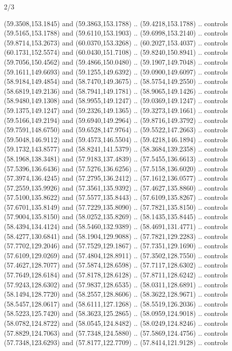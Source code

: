 \begin{flagdescription}{2/3}
\begin{scope}[shift={(0.5\flaglength,0.5)},scale=\flagwidth/320]
\begin{scope}[y=0.8pt, x=0.8pt, yscale=-1,shift={(-118.3,-146)}]
  (59.3508,153.1845) and (59.3863,153.1788) .. (59.4218,153.1788) .. controls
  (59.5165,153.1788) and (59.6110,153.1903) .. (59.6998,153.2140) .. controls
  (59.8714,153.2673) and (60.0370,153.3268) .. (60.2027,153.4037) .. controls
  (60.1731,152.5574) and (60.0430,151.7108) .. (59.8240,150.8941) .. controls
  (59.7056,150.4562) and (59.4866,150.0480) .. (59.1907,149.7048) .. controls
  (59.1611,149.6693) and (59.1255,149.6392) .. (59.0900,149.6097) .. controls
  (58.9184,149.4854) and (58.7470,149.3675) .. (58.5754,149.2550) .. controls
  (58.6819,149.2136) and (58.7941,149.1781) .. (58.9065,149.1426) .. controls
  (58.9480,149.1308) and (58.9955,149.1247) .. (59.0369,149.1247) .. controls
  (59.1375,149.1247) and (59.2326,149.1365) .. (59.3273,149.1661) .. controls
  (59.5166,149.2194) and (59.6940,149.2964) .. (59.8716,149.3792) .. controls
  (59.7591,148.6750) and (59.6528,147.9764) .. (59.5522,147.2663) .. controls
  (59.5048,146.9112) and (59.4573,146.5504) .. (59.4218,146.1894) .. controls
  (59.1732,143.8577) and (58.8241,141.5379) .. (58.3684,139.2358) .. controls
  (58.1968,138.3481) and (57.9183,137.4839) .. (57.5455,136.6613) .. controls
  (57.5396,136.6436) and (57.5276,136.6256) .. (57.5158,136.6020) .. controls
  (57.3974,136.4245) and (57.2795,136.2412) .. (57.1612,136.0577) .. controls
  (57.2559,135.9926) and (57.3561,135.9392) .. (57.4627,135.8860) .. controls
  (57.5100,135.8622) and (57.5577,135.8443) .. (57.6109,135.8267) .. controls
  (57.6701,135.8149) and (57.7229,135.8090) .. (57.7821,135.8150) .. controls
  (57.9004,135.8150) and (58.0252,135.8269) .. (58.1435,135.8445) .. controls
  (58.4394,134.4124) and (58.5460,132.9389) .. (58.4691,131.4771) .. controls
  (58.4277,130.6841) and (58.1904,129.9088) .. (57.7821,129.2283) .. controls
  (57.7702,129.2046) and (57.7529,129.1867) .. (57.7351,129.1690) .. controls
  (57.6109,129.0269) and (57.4804,128.8911) .. (57.3502,128.7550) .. controls
  (57.4627,128.7077) and (57.5874,128.6598) .. (57.7117,128.6302) .. controls
  (57.7649,128.6184) and (57.8178,128.6128) .. (57.8711,128.6242) .. controls
  (57.9243,128.6302) and (57.9837,128.6535) .. (58.0311,128.6891) .. controls
  (58.1494,128.7720) and (58.2557,128.8606) .. (58.3622,128.9671) .. controls
  (58.5457,128.0617) and (58.6111,127.1268) .. (58.5519,126.2036) .. controls
  (58.5223,125.7420) and (58.3623,125.2865) .. (58.0959,124.9018) .. controls
  (58.0782,124.8722) and (58.0545,124.8482) .. (58.0249,124.8246) .. controls
  (57.8829,124.7063) and (57.7348,124.5880) .. (57.5869,124.4756) .. controls
  (57.7348,123.6293) and (57.8177,122.7709) .. (57.8414,121.9128) .. controls

\end{scope}
\end{scope}
\end{flagdescription}
